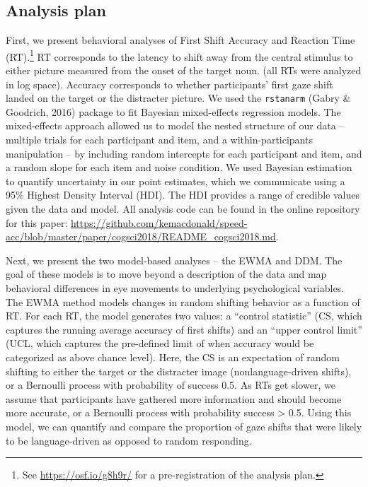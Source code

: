 \documentclass[10pt, letterpaper]{article}
\begin{document}
\subsection{Analysis plan}\label{analysis-plan}

First, we present behavioral analyses of First Shift Accuracy and
Reaction Time (RT).\footnote{See \url{https://osf.io/g8h9r/} for a
  pre-registration of the analysis plan.} RT corresponds to the latency
to shift away from the central stimulus to either picture measured from
the onset of the target noun. (all RTs were analyzed in log space).
Accuracy corresponds to whether participants' first gaze shift landed on
the target or the distracter picture. We used the \texttt{rstanarm}
(Gabry \& Goodrich, 2016) package to fit Bayesian mixed-effects
regression models. The mixed-effects approach allowed us to model the
nested structure of our data -- multiple trials for each participant and
item, and a within-participants manipulation -- by including random
intercepts for each participant and item, and a random slope for each
item and noise condition. We used Bayesian estimation to quantify
uncertainty in our point estimates, which we communicate using a 95\%
Highest Density Interval (HDI). The HDI provides a range of credible
values given the data and model. All analysis code can be found in the
online repository for this paper:
\url{https://github.com/kemacdonald/speed-acc/blob/master/paper/cogsci2018/README_cogsci2018.md}.

Next, we present the two model-based analyses -- the EWMA and DDM. The
goal of these models is to move beyond a description of the data and map
behavioral differences in eye movements to underlying psychological
variables. The EWMA method models changes in random shifting behavior as
a function of RT. For each RT, the model generates two values: a
``control statistic'' (CS, which captures the running average accuracy
of first shifts) and an ``upper control limit'' (UCL, which captures the
pre-defined limit of when accuracy would be categorized as above chance
level). Here, the CS is an expectation of random shifting to either the
target or the distracter image (nonlanguage-driven shifts), or a
Bernoulli process with probability of success 0.5. As RTs get slower, we
assume that participants have gathered more information and should
become more accurate, or a Bernoulli process with probability success
\textgreater{} 0.5. Using this model, we can quantify and compare the
proportion of gaze shifts that were likely to be language-driven as
opposed to random responding.
\end{document}
